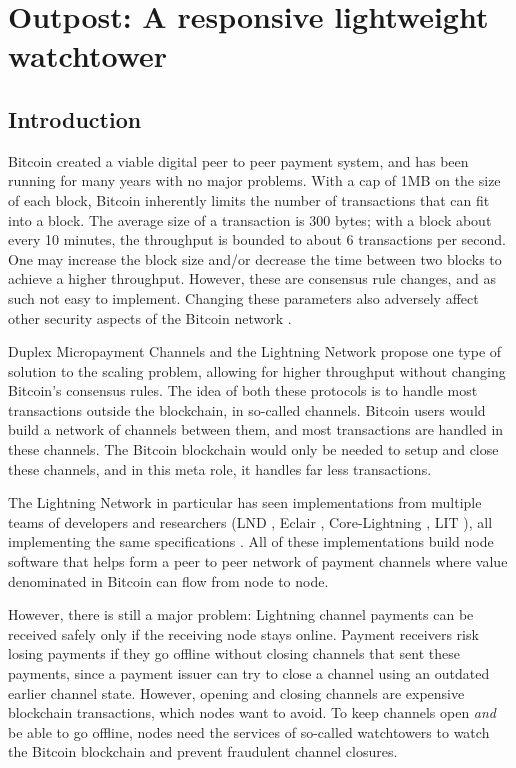 \chapter{Outpost: A responsive lightweight watchtower}  %
\label{chapter:outpost}

\section{Introduction}
Bitcoin \cite{bitcoin_whitepaper} created a viable digital peer to peer payment system, and has been running for many years with no major problems. With a cap of 1MB on the size of each block, Bitcoin inherently limits the number of transactions that can fit into a block. The average size of a transaction is 300 bytes; with a block about every 10 minutes, the throughput is bounded to about 6 transactions per second. One may increase the block size and/or decrease the time between two blocks to achieve a higher throughput. However, these are consensus rule changes, and as such not easy to implement. Changing these parameters also adversely affect other security aspects of the Bitcoin network \cite{gervais2016security}.

Duplex Micropayment Channels \cite{decker_wattenhofer} and the Lightning Network \cite{poon_dryja} propose one type of solution to the scaling problem, allowing for higher throughput without changing Bitcoin's consensus rules. The idea of both these protocols is to handle most transactions outside the blockchain, in so-called channels. Bitcoin users would build a network of channels between them, and most transactions are handled in these channels. The Bitcoin blockchain would only be needed to setup and close these channels, and in this meta role, it handles far less transactions. 

The Lightning Network in particular has seen implementations from multiple teams of developers and researchers (LND \cite{lnd}, Eclair \cite{eclair}, Core-Lightning \cite{c_lightning}, LIT \cite{lit}), all implementing the same specifications \cite{bolt}. All of these implementations build node software that helps form a peer to peer network of payment channels where value denominated in Bitcoin can flow from node to node. 

However, there is still a major problem: Lightning channel payments can be received safely only if the receiving node stays online. Payment receivers risk losing payments if they go offline without closing channels that sent these payments, since a payment issuer can try to close a channel using an outdated earlier channel state. However, opening and closing channels are expensive blockchain transactions, which nodes want to avoid. To keep channels open \textit{and} be able to go offline, nodes need the services of so-called watchtowers \cite{watchtowers} to watch the Bitcoin blockchain and prevent fraudulent channel closures.

